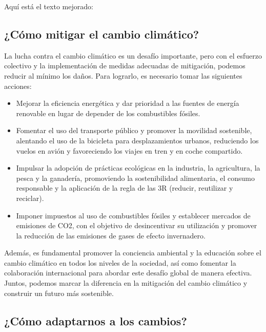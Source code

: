 \documentclass[
  a4paper,
]{article}
\begin{document}
Aquí está el texto mejorado:

\hypertarget{cuxf3mo-mitigar-el-cambio-climuxe1tico}{%
\subsection{¿Cómo mitigar el cambio
climático?}\label{cuxf3mo-mitigar-el-cambio-climuxe1tico}}

La lucha contra el cambio climático es un desafío importante, pero con
el esfuerzo colectivo y la implementación de medidas adecuadas de
mitigación, podemos reducir al mínimo los daños. Para lograrlo, es
necesario tomar las siguientes acciones:

\begin{itemize}
\item
  Mejorar la eficiencia energética y dar prioridad a las fuentes de
  energía renovable en lugar de depender de los combustibles fósiles.
\item
  Fomentar el uso del transporte público y promover la movilidad
  sostenible, alentando el uso de la bicicleta para desplazamientos
  urbanos, reduciendo los vuelos en avión y favoreciendo los viajes en
  tren y en coche compartido.
\item
  Impulsar la adopción de prácticas ecológicas en la industria, la
  agricultura, la pesca y la ganadería, promoviendo la sostenibilidad
  alimentaria, el consumo responsable y la aplicación de la regla de las
  3R (reducir, reutilizar y reciclar).
\item
  Imponer impuestos al uso de combustibles fósiles y establecer mercados
  de emisiones de CO2, con el objetivo de desincentivar su utilización y
  promover la reducción de las emisiones de gases de efecto invernadero.
\end{itemize}

Además, es fundamental promover la conciencia ambiental y la educación
sobre el cambio climático en todos los niveles de la sociedad, así como
fomentar la colaboración internacional para abordar este desafío global
de manera efectiva. Juntos, podemos marcar la diferencia en la
mitigación del cambio climático y construir un futuro más sostenible.

\hypertarget{cuxf3mo-adaptarnos-a-los-cambios}{%
\subsection{¿Cómo adaptarnos a los
cambios?}\label{cuxf3mo-adaptarnos-a-los-cambios}}
\end{document}
